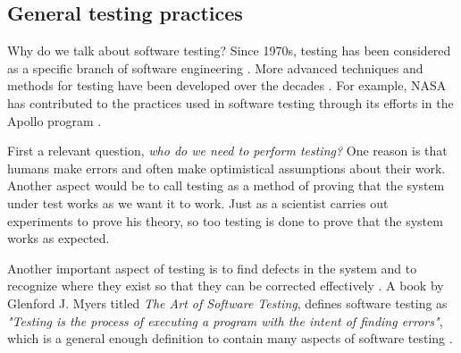 \documentclass[english,12pt,a4paper,pdftex,elec,utf8]{aaltothesis}
\begin{document}
\subsection{General testing practices}
Why do we talk about software testing?
Since 1970s, testing has been considered as a specific branch of software engineering \cite{artofsofttesting, compinspace}. More advanced techniques and methods for testing have been developed over the decades \cite{artofsofttesting}. For example, 
NASA has contributed to the practices used in software testing through its efforts in the Apollo program \cite{compinspace}. \par
First a relevant question, \textit{who do we need to perform testing?} One reason is that humans make errors and often make optimistical assumptions about their work. Another aspect would be to call testing as a method of proving that the system under test works as we want it to work. Just as  a scientist carries out experiments to prove his theory, so too testing is done to prove that the system works as expected. \cite{testingcomplex}\par
Another important aspect of testing is to find defects in the system and to recognize where they exist so that they can be corrected effectively \cite{sularikurssi, artofsofttesting}. A book by Glenford J. Myers titled \textit{The Art of Software Testing}, defines software testing as \textit{"Testing is the process of executing a program with the intent of finding errors"}, which is a general enough definition to contain many aspects of software testing \cite{artofsofttesting}.
\end{document}
